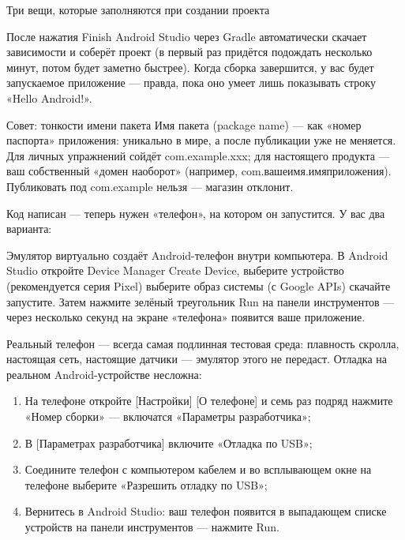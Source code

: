 \begin{center}\small\color{gray}Три вещи, которые заполняются при создании проекта\end{center}

После нажатия Finish Android Studio через Gradle автоматически скачает зависимости и соберёт проект (в первый раз придётся подождать несколько минут, потом будет заметно быстрее). Когда сборка завершится, у вас будет запускаемое приложение — правда, пока оно умеет лишь показывать строку «Hello Android!».

\begin{tcbinfo}{Совет: тонкости имени пакета}
Имя пакета (package name) — как «номер паспорта» приложения: уникально в мире, а после публикации уже не меняется. Для личных упражнений сойдёт com.example.xxx; для настоящего продукта — ваш собственный «домен наоборот» (например, com.вашеимя.имяприложения). Публиковать под com.example нельзя — магазин отклонит.

\end{tcbinfo}


Код написан — теперь нужен «телефон», на котором он запустится. У вас два варианта:


Эмулятор виртуально создаёт Android-телефон внутри компьютера. В Android Studio откройте Device Manager Create Device, выберите устройство (рекомендуется серия Pixel) выберите образ системы (с Google APIs) скачайте запустите. Затем нажмите зелёный треугольник Run на панели инструментов — через несколько секунд на экране «телефона» появится ваше приложение.


Реальный телефон — всегда самая подлинная тестовая среда: плавность скролла, настоящая сеть, настоящие датчики — эмулятор этого не передаст. Отладка на реальном Android-устройстве несложна:

\begin{enumerate}
  \item На телефоне откройте [Настройки] [О телефоне] и семь раз подряд нажмите «Номер сборки» — включатся «Параметры разработчика»;
  \item В [Параметрах разработчика] включите «Отладка по USB»;
  \item Соедините телефон с компьютером кабелем и во всплывающем окне на телефоне выберите «Разрешить отладку по USB»;
  \item Вернитесь в Android Studio: ваш телефон появится в выпадающем списке устройств на панели инструментов — нажмите Run.
\end{enumerate}

